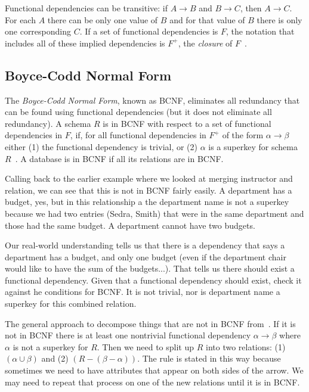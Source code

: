 \documentclass[a4paper]{report}
\begin{document}
Functional dependencies can be transitive: if $A \rightarrow B$ and $B \rightarrow C$, then $A \rightarrow C$. For each $A$ there can be only one value of $B$ and for that value of $B$ there is only one corresponding $C$. If a set of functional dependencies is $F$, the notation that includes all of these implied dependencies is $F^{+}$, the \textit{closure} of $F$~\cite{dsc}.

\subsection*{Boyce-Codd Normal Form}

The \textit{Boyce-Codd Normal Form}, known as BCNF, eliminates all redundancy that can be found using functional dependencies (but it does not eliminate all redundancy). A schema $R$ is in BCNF with respect to a set of functional dependencies in $F$, if, for all functional dependencies in $F^{+}$ of the form $\alpha \rightarrow \beta$ either (1) the functional dependency is trivial, or (2) $\alpha$ is a superkey for schema $R$~\cite{dsc}. A database is in BCNF if all its relations are in BCNF.

Calling back to the earlier example where we looked at merging instructor and relation, we can see that this is not in BCNF fairly easily. A department has a budget, yes, but in this relationship a the department name is not a superkey because we had two entries (Sedra, Smith) that were in the same department and those had the same budget. A department cannot have two budgets.

Our real-world understanding tells us that there is a dependency that says a department has a budget, and only one budget (even if the department chair would like to have the sum of the budgets...). That tells us there should exist a functional dependency. Given that a functional dependency should exist, check it against he conditions for BCNF. It is not trivial, nor is department name a superkey for this combined relation.

The general approach to decompose things that are not in BCNF from~\cite{dsc}. If it is not in BCNF there is at least one nontrivial functional dependency $\alpha \rightarrow \beta$ where $\alpha$ is not a superkey for $R$. Then we need to split up $R$ into two relations: (1) $(\alpha \cup \beta)$ and (2) $(R - (\beta - \alpha))$. The rule is stated in this way because sometimes we need to have attributes that appear on both sides of the arrow. We may need to repeat that process on one of the new relations until it is in BCNF.
\end{document}
